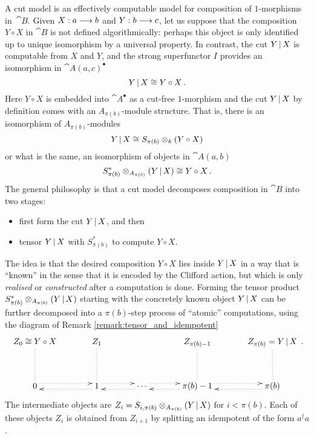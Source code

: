 \documentclass[english,letter paper,12pt,leqno]{article}
\theoremstyle{example}
\numberwithin{equation}{section}
\begin{document}
A cut model is an effectively computable model for composition of $1$-morphisms in~$\cat{B}$. Given $X: a \longrightarrow b$ and $Y: b \longrightarrow c$, let us suppose that the composition $Y \circ X$ in $\cat{B}$ is not defined algorithmically: perhaps this object is only identified up to unique isomorphism by a universal property. In contrast, the cut $Y \,|\, X$ is computable from $X$ and $Y$, and the strong superfunctor $I$ provides an isomorphism in $\cat{A}(a,c)^\bullet$
\begin{equation}
Y \,|\, X \cong Y \circ X\,.
\end{equation}
Here $Y \circ X$ is embedded into $\cat{A}^\bullet$ as a cut-free $1$-morphism and the cut $Y \,|\, X$ by definition comes with an $A_{\pi(b)}$-module structure. That is, there is an isomorphism of $A_{\pi(b)}$-modules
\begin{equation}\label{eq:cutvsoriginal}
Y \,|\, X \cong S_{\pi(b)} \otimes_k (Y \circ X )
\end{equation}
or what is the same, an isomorphism of objects in $\cat{A}(a,b)$
\begin{equation}\label{eq:cutvsoriginal2}
S^*_{\pi(b)} \otimes_{A_{\pi(b)}} ( Y \,|\, X ) \cong Y \circ X \,.
\end{equation}
The general philosophy is that a cut model decomposes composition in $\cat{B}$ into two stages: 
\begin{itemize}
\item first form the cut $Y \,|\, X$, and then
\item tensor $Y \,|\, X$ with $S^*_{\pi(b)}$ to compute $Y \circ X$. 
\end{itemize}
The idea is that the desired composition $Y \circ X$ lies inside $Y \,|\, X$ in a way that is ``known'' in the sense that it is encoded by the Clifford action, but which is only \emph{realised} or \emph{constructed} after a computation is done. Forming the tensor product $S^*_{\pi(b)} \otimes_{A_{\pi(b)}} ( Y \,|\, X )$ starting with the concretely known object $Y \,|\, X$ can be further decomposed into a $\pi(b)$-step process of ``atomic'' computations, using the diagram of Remark \ref{remark:tensor_and_idempotent}
\begin{equation}\label{eq:computation_fiber_diagram}
\xymatrix@C+1pc@R+1pc{
Z_0 \cong Y \circ X \ar@{.}[d] & Z_1 \ar@{.}[d] & & Z_{\pi(b)-1} \ar@{.}[d] & Z_{\pi(b)} = Y \l X \ar@{.}[d]\\
0 \ar@{.>}@<0.8ex>[r] & 1 \ar@{.>}@<0.8ex>[r]\ar@{.>}@<0.8ex>[l] & \cdots \ar@{.>}@<0.8ex>[l]\ar@{.>}@<0.8ex>[r] & \pi(b)-1  \ar@{.>}@<0.8ex>[l]\ar@{.>}@<0.8ex>[r] & \pi(b) \ar@{.>}@<0.8ex>[l]
}\,.
\end{equation}
The intermediate objects are $Z_i = S_{i, \pi(b)} \otimes_{A_{\pi(b)}} ( Y \,|\, X )$ for $i < \pi(b)$. Each of these objects $Z_i$ is obtained from $Z_{i+1}$ by splitting an idempotent of the form $a^\dagger a$.
\end{document}
